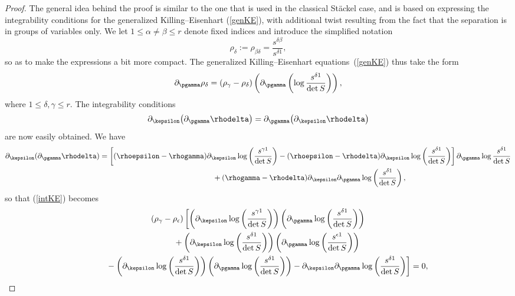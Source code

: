 \begin{proof}
The general idea behind the proof is similar to the one that is used in the classical St\"ackel case, and is based on expressing the integrability conditions for the generalized Killing--Eisenhart (\ref{genKE}), with additional twist resulting from the fact that the separation is in groups of variables only. We let $1\leq \alpha \neq \beta \leq r$ denote fixed indices and introduce the simplified notation
\[
\rho_{\delta}:=\rho_{ \beta \delta}=\frac{s^{\delta \beta}}{s^{\delta 1}},
\]
so as to make the expressions a bit more compact. The generalized Killing--Eisenhart equa\-tions~(\ref{genKE}) thus take the form
\begin{gather*}%
\partial_{\pgamma} \rho_{\delta}= (\rho_{\gamma}-\rho_{\delta })\left(\partial_{\pgamma}\left(\log \frac{s^{\delta 1}}{\det S}\right)\right),
\end{gather*}
where $1\leq \delta,\gamma \leq r$. The integrability conditions
\begin{gather}\label{intKE}
\partial_{\kepsilon}\big(\partial_{\pgamma} \rhodelta \big)=\partial_{\pgamma}\big(\partial_{\kepsilon} \rhodelta \big)
\end{gather}
are now easily obtained. We have
\begin{gather*}
\partial_{\kepsilon} (\partial_{\pgamma} \rhodelta )= \left[(\rhoepsilon-\rhogamma)\partial_{\kepsilon}\log\left(\frac{s^{\gamma 1}}{\det S}\right)-(\rhoepsilon-\rhodelta)\partial_{\kepsilon}\log\left(\frac{s^{\delta 1}}{\det S}\right)\right] \partial_{\pgamma} \log \frac{s^{\delta 1}}{\det S} \\
\hphantom{\partial_{\kepsilon} (\partial_{\pgamma} \rhodelta )=}{} + (\rhogamma-\rhodelta)\partial_{\kepsilon}\partial_{\pgamma}\log\left(\frac{s^{\delta 1}}{\det S}\right),
\end{gather*}
so that (\ref{intKE}) becomes
\begin{gather}
(\rho_{\gamma}-\rho_{\epsilon})\left[\left(\partial_{\kepsilon}\log\left(\frac{s^{\gamma 1}}{\det S}\right)\right)\left(\partial_{\pgamma}\log\left(\frac{s^{\delta 1}}{\det S}\right)\right)\right.\nonumber\\
\qquad{} +\left(\partial_{\kepsilon}\log\left(\frac{s^{\delta 1}}{\det S}\right)\right)\left(\partial_{\pgamma}\log\left(\frac{s^{\epsilon 1}}{\det S}\right)\right) \nonumber\\
\left.\qquad{} -\left(\partial_{\kepsilon}\log\left(\frac{s^{\delta 1}}{\det S}\right)\right)\left(\partial_{\pgamma}\log\left(\frac{s^{\delta 1}}{\det S}\right)\right)-\partial_{\kepsilon}\partial_{\pgamma}\log\left(\frac{s^{\delta 1}}{\det S}\right)\right]=0,\label{compat}

\end{gather}
\end{proof}
